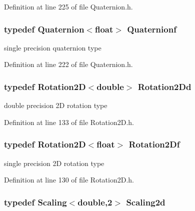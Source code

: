 Definition at line 225 of file Quaternion.\-h.

\hypertarget{group___geometry___module_gaf65cf6f803890e57488d7de750bef682}{
\subsubsection[{Quaternionf}]{\setlength{\rightskip}{0pt plus 5cm}typedef {\bf Quaternion}$<${\bf float}$>$ {\bf Quaternionf}}}\label{group___geometry___module_gaf65cf6f803890e57488d7de750bef682}
single precision quaternion type 

Definition at line 222 of file Quaternion.\-h.

\hypertarget{group___geometry___module_ga197b898c965d08135ebfb21bf41b23e2}{
\subsubsection[{Rotation2\-Dd}]{\setlength{\rightskip}{0pt plus 5cm}typedef {\bf Rotation2\-D}$<${\bf double}$>$ {\bf Rotation2\-Dd}}}\label{group___geometry___module_ga197b898c965d08135ebfb21bf41b23e2}
double precision 2\-D rotation type 

Definition at line 133 of file Rotation2\-D.\-h.

\hypertarget{group___geometry___module_ga9a907f59280ce5650106a74904bab16d}{
\subsubsection[{Rotation2\-Df}]{\setlength{\rightskip}{0pt plus 5cm}typedef {\bf Rotation2\-D}$<${\bf float}$>$ {\bf Rotation2\-Df}}}\label{group___geometry___module_ga9a907f59280ce5650106a74904bab16d}
single precision 2\-D rotation type 

Definition at line 130 of file Rotation2\-D.\-h.

\hypertarget{group___geometry___module_ga0bd9ad6cbbd04e19839c3099ec4cc2f9}{
\subsubsection[{Scaling2d}]{\setlength{\rightskip}{0pt plus 5cm}typedef {\bf Scaling}$<${\bf double},2$>$ {\bf Scaling2d}}}\label{group___geometry___module_ga0bd9ad6cbbd04e19839c3099ec4cc2f9}



